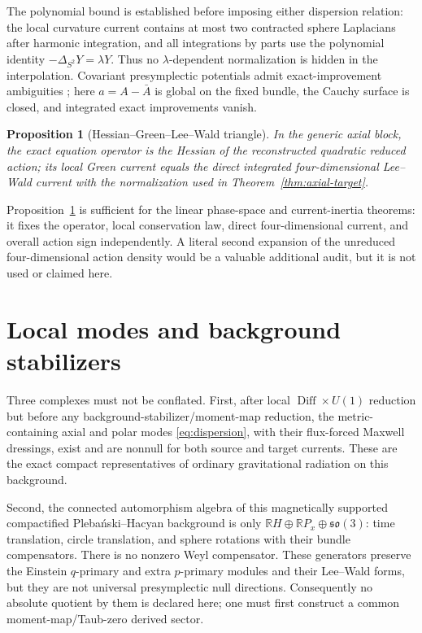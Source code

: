 \documentclass[11pt]{article}
\newtheorem{proposition}[theorem]{Proposition}
\theoremstyle{remark}
\newcommand{\Diff}{\operatorname{Diff}}
\begin{document}
The polynomial bound is established before imposing either dispersion
relation: the local curvature current contains at most two contracted sphere
Laplacians after harmonic integration, and all integrations by parts use the
polynomial identity $-\Delta_{S^2}Y=\lambda Y$. Thus no
$\lambda$-dependent normalization is hidden in the interpolation. Covariant
presymplectic potentials admit exact-improvement ambiguities
\cite{HarlowWu}; here $a=A-\bar A$ is global on the fixed bundle, the Cauchy
surface is closed, and integrated exact improvements vanish.

\begin{proposition}[Hessian--Green--Lee--Wald triangle]
\label{prop:triangle}
In the generic axial block, the exact equation operator is the Hessian of the
reconstructed quadratic reduced action; its local Green current equals the
direct integrated four-dimensional Lee--Wald current with the normalization
used in Theorem~\ref{thm:axial-target}.
\end{proposition}

Proposition~\ref{prop:triangle} is sufficient for the linear phase-space and
current-inertia theorems: it fixes the operator, local conservation law, direct
four-dimensional current, and overall action sign independently. A literal
second expansion of the unreduced four-dimensional action density would be a
valuable additional audit, but it is not used or claimed here.

\section{Local modes and background stabilizers}
\label{sec:interpretation}

Three complexes must not be conflated. First, after local
$\Diff\times U(1)$ reduction but before any background-stabilizer/moment-map
reduction, the
metric-containing axial and polar modes \eqref{eq:dispersion}, with their
flux-forced Maxwell dressings, exist and are nonnull for both source and
target currents. These are the exact compact representatives of ordinary
gravitational radiation on this background.

Second, the connected automorphism algebra of this magnetically supported
compactified Pleba\'nski--Hacyan background is only
$\mathbb R H\oplus\mathbb R P_x\oplus\mathfrak{so}(3)$: time translation,
circle translation, and sphere rotations with their bundle compensators.
There is no nonzero Weyl compensator. These generators preserve the Einstein
$q$-primary and extra $p$-primary modules and their Lee--Wald forms, but they
are not universal presymplectic null directions. Consequently no absolute
quotient by them is declared here; one must first construct a common
moment-map/Taub-zero derived sector.
\end{document}
